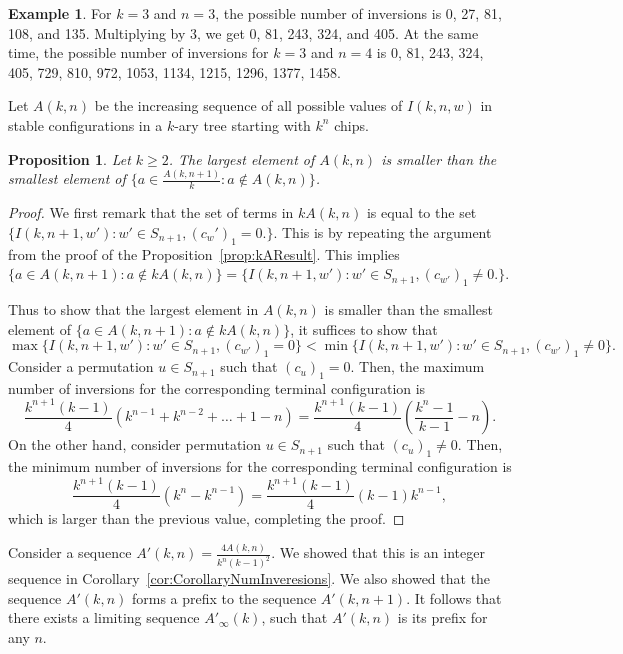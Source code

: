 \documentclass[final]{dmtcs-episciences}
\newtheorem{proposition}[theorem]{Proposition}
\theoremstyle{definition}
\newtheorem{example}{Example}
\theoremstyle{remark}
\begin{document}
\begin{example}
    For $k=3$ and $n=3$, the possible number of inversions is 0, 27, 81, 108, and 135. Multiplying by 3, we get 0, 81, 243, 324, and 405. At the same time, the possible number of inversions for $k=3$ and $n=4$ is 0, 81, 243, 324, 405, 729, 810, 972, 1053, 1134, 1215, 1296, 1377, 1458.
\end{example}

Let $A(k,n)$ be the increasing sequence of all possible values of $I(k, n, w)$ in stable configurations in a $k$-ary tree starting with $k^n$ chips.

\begin{proposition}
    Let $k \geq 2$. The largest element of $A(k, n)$ is smaller than the smallest element of $\{a \in \frac{A(k, n+1)}{k}: a \not\in A(k, n)\}$.
\end{proposition}
\begin{proof}
    We first remark that the set of terms in $k A(k, n)$ is equal to the set $\{I(k,n+1, w'): w' \in S_{n+1}, (c_w')_1 = 0.\}$. This is by repeating the argument from the proof of the Proposition~\ref{prop:kAResult}. This implies $\{a \in A(k, n+1): a \not\in k A(k, n)\} = \{I(k,n+1, w'): w' \in S_{n+1}, (c_{w'})_1 \neq 0.\}$.
    
    Thus to show that the largest element in $A(k,n)$ is smaller than the smallest element of $\{a \in A(k, n+1): a \not\in k A(k, n) \}$, it suffices to show that
    \[\max \{I(k, n+1, w'): w' \in S_{n+1}, (c_{w'})_1 = 0\} < \min \{I(k,n+1, w'): w' \in S_{n+1}, (c_{w'})_1 \neq 0\}.\]
    Consider a permutation $u \in S_{n+1}$ such that $(c_u)_1=0$. Then, the maximum number of inversions for the corresponding terminal configuration is 
    \[ \frac{k^{n+1} (k-1)}{4} (k^{n-1}+k^{n-2} + \dots + 1 - n) = \frac{k^{n+1}(k-1)}{4}\left(\frac{k^n-1}{k-1}-n\right).\]
    On the other hand, consider permutation $u \in S_{n+1}$ such that $(c_u)_1 \neq 0$. Then, the minimum number of inversions for the corresponding terminal configuration is 
    \[\frac{k^{n+1}(k-1)}{4} (k^{n} - k^{n-1}) = \frac{k^{n+1}(k-1)}{4}(k-1)k^{n-1},\]
    which is larger than the previous value, completing the proof.
\end{proof}

 Consider a sequence $A'(k,n) = \frac{4A(k,n)}{k^{n}(k-1)^2}$. We showed that this is an integer sequence in Corollary~\ref{cor:CorollaryNumInveresions}. We also showed that the sequence $A'(k,n)$ forms a prefix to the sequence $A'(k,n+1)$. It follows that there exists a limiting sequence $A'_\infty(k)$, such that $A'(k,n)$ is its prefix for any $n$.
\end{document}
